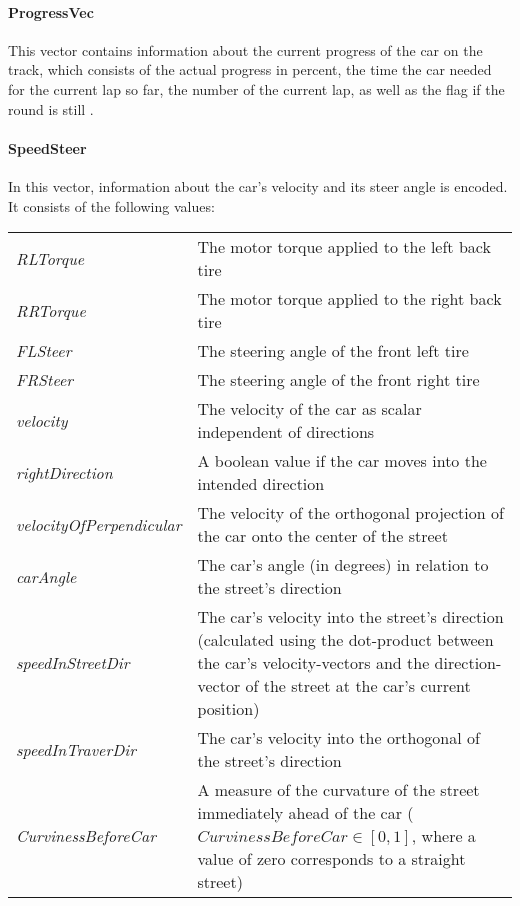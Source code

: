 \paragraph{ProgressVec} This vector contains information about the current progress of the car on the track, which consists of the actual progress in percent, the time the car needed for the current lap so far, the number of the current lap, as well as the flag if the round is still .

\paragraph{SpeedSteer} In this vector, information about the car's velocity and its steer angle is encoded. It consists of the following values:

\renewcommand{\arraystretch}{1.3}
\begin{flushleft}
	\begin{tabular}{>{\em}p{2.9cm} p{\textwidth-3.8cm}} 
		RLTorque & The motor torque applied to the left back tire\\
		RRTorque & The motor torque applied to the right back tire\\
		FLSteer & The steering angle of the front left tire\\
		FRSteer & The steering angle of the front right tire\\
		velocity & The velocity of the car as scalar independent of directions\\
		rightDirection & A boolean value if the car moves into the intended direction\\
		velocityOfPerpendicular & \hspace*{0.8cm} The velocity of the orthogonal projection of the car onto the center of the street\\ %
		carAngle & The car's angle (in degrees) in relation to the street's direction\\
		speedInStreetDir & The car's velocity into the street's direction (calculated using the dot-product between the car's velocity-vectors and the direction-vector of the street at the car's current position)\\
		speedInTraverDir &  The car's velocity into the orthogonal of the street's direction\\
		CurvinessBeforeCar & A measure of the curvature of the street immediately ahead of the car ($CurvinessBeforeCar \in [0,1]$, where a value of zero corresponds to a straight street)\\	
	\end{tabular}
\end{flushleft}

